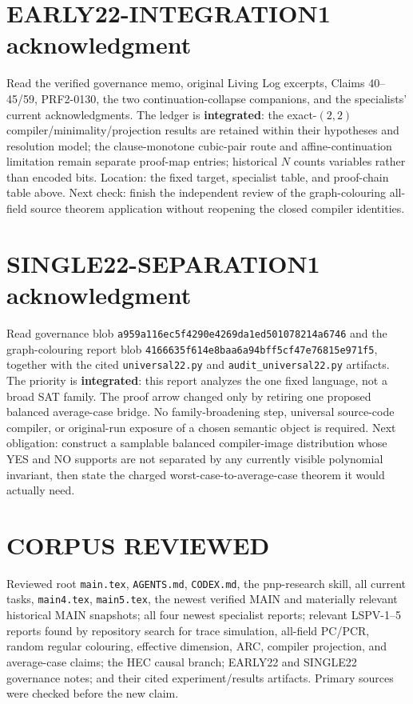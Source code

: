 \documentclass[11pt]{article}
\begin{document}
\section{EARLY22-INTEGRATION1 acknowledgment}
Read the verified governance memo, original Living Log excerpts, Claims
40--45/59, PRF2-0130, the two continuation-collapse companions, and the
specialists' current acknowledgments.  The ledger is \textbf{integrated}:
the exact-$(2,2)$ compiler/minimality/projection results are retained within
their hypotheses and resolution model; the clause-monotone cubic-pair route
and affine-continuation limitation remain separate proof-map entries;
historical $N$ counts variables rather than encoded bits.  Location: the
fixed target, specialist table, and proof-chain table above.  Next check:
finish the independent review of the graph-colouring all-field source
theorem application without reopening the closed compiler identities.

\section{SINGLE22-SEPARATION1 acknowledgment}
Read governance blob
\texttt{a959a116ec5f4290e4269da1ed501078214a6746} and the graph-colouring
report blob \texttt{4166635f614e8baa6a94bff5cf47e76815e971f5}, together with
the cited \texttt{universal22.py} and \texttt{audit\_universal22.py}
artifacts.  The priority is \textbf{integrated}: this report analyzes the
one fixed language, not a broad SAT family.  The proof arrow changed only by
retiring one proposed balanced average-case bridge.  No family-broadening
step, universal source-code compiler, or original-run exposure of a chosen
semantic object is required.  Next obligation: construct a samplable
balanced compiler-image distribution whose YES and NO supports are not
separated by any currently visible polynomial invariant, then state the
charged worst-case-to-average-case theorem it would actually need.

\section{CORPUS REVIEWED}
Reviewed root \texttt{main.tex}, \texttt{AGENTS.md}, \texttt{CODEX.md}, the
pnp-research skill, all current tasks, \texttt{main4.tex},
\texttt{main5.tex}, the newest verified MAIN and materially relevant
historical MAIN snapshots; all four newest specialist reports; relevant
LSPV-1--5 reports found by repository search for trace simulation,
all-field PC/PCR, random regular colouring, effective dimension, ARC,
compiler projection, and average-case claims; the HEC causal branch;
EARLY22 and SINGLE22 governance notes; and their cited experiment/results
artifacts.  Primary sources \cite{conneryd,bt,hk,ln} were checked before the
new claim.
\end{document}

